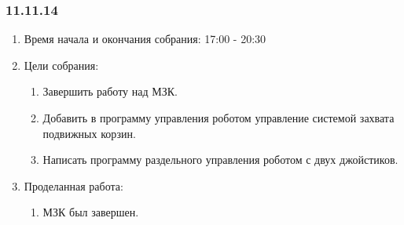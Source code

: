
\subsubsection{11.11.14}

\begin{enumerate} 
	\item Время начала и окончания собрания:
	17:00 - 20:30
	\item Цели собрания:
	\begin{enumerate}
		\item Завершить работу над МЗК.
		
		\item Добавить в программу управления роботом управление системой захвата подвижных корзин.
		
		\item Написать программу раздельного управления роботом с двух джойстиков.
		
	\end{enumerate}
	
	\item Проделанная работа:
	\begin{enumerate}
		\item МЗК был завершен.
		

\end{enumerate}
\end{enumerate}
